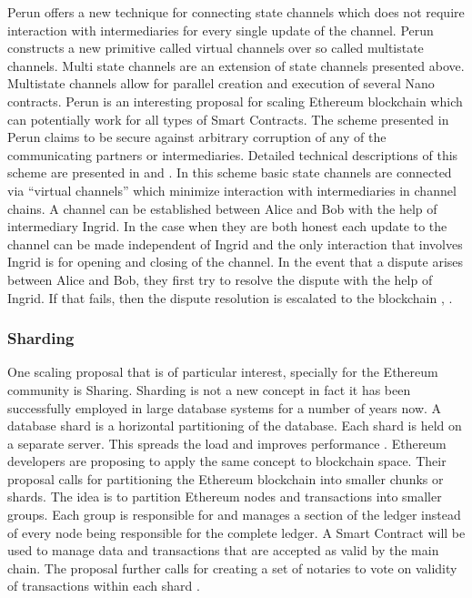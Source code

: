 Perun offers a new technique for connecting state channels which does not require interaction with intermediaries for every single update of the channel. Perun constructs a new primitive called virtual channels over so called multistate channels. Multi state channels are an extension of state channels presented above. Multistate channels allow for parallel creation and execution of several Nano contracts. Perun is an interesting proposal for scaling Ethereum blockchain which can potentially work for all types of Smart Contracts. The scheme presented in Perun claims to be secure against arbitrary corruption of any of the communicating partners or intermediaries. Detailed technical descriptions of this scheme are presented in \cite{cryptoeprint:2018:320} and \cite{cryptoeprint:2017:635}. In this scheme basic state channels are connected via “virtual channels” which minimize interaction with intermediaries in channel chains. A channel can be established between Alice and Bob with the help of intermediary Ingrid. In the case when they are both honest each update to the channel can be made independent of Ingrid and the only interaction that involves Ingrid is for opening and closing of the channel. In the event that a dispute arises between Alice and Bob, they first try to resolve the dispute with the help of Ingrid. If that fails, then the dispute resolution is escalated to the blockchain \cite{cryptoeprint:2018:320}, \cite{cryptoeprint:2017:635}.

\subsubsection{Sharding} \label{Shard} 
One scaling proposal that is of particular interest, specially for the Ethereum community is Sharing. Sharding is not a new concept in fact it has been successfully employed in large database systems for a number of years now. A database shard is a horizontal partitioning of the database. Each shard is held on a separate server. This spreads the load and improves performance \cite{Corbett:2012:SGG:2387880.2387905}. Ethereum developers are proposing to apply the same concept to blockchain space. Their proposal calls for partitioning the Ethereum blockchain into smaller chunks or shards. The idea is to partition Ethereum nodes and transactions into smaller groups. Each group is responsible for and manages a section of the ledger instead of every node being responsible for the complete ledger. A Smart Contract will be used to manage data and transactions that are accepted as valid by the main chain. The proposal further calls for creating a set of notaries to vote on validity of transactions within each shard \cite{eth:009}. 
\vspace{0.5cm}  
